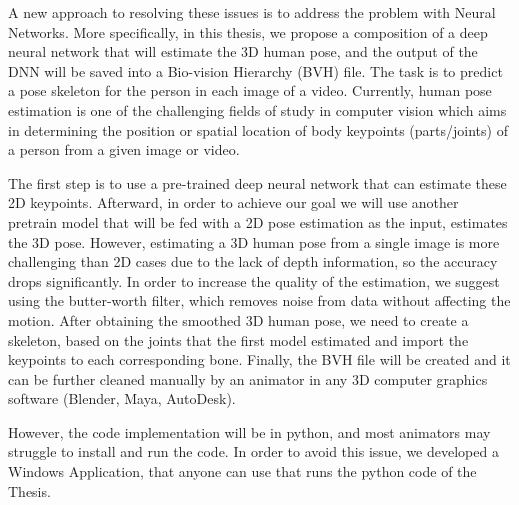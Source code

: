 A new approach to resolving these issues is to address the problem with Neural Networks. More specifically, in this thesis, we propose a composition of a deep neural network \cite{Exploiting temporal information for 3D pose estimation} that will estimate the 3D human pose, and the output of the DNN will be saved into a Bio-vision Hierarchy (BVH) file. The task is to predict a pose skeleton for the person in each image of a video. Currently, human pose estimation is one of the challenging fields of study in computer vision which aims in determining the position or spatial location of body keypoints (parts/joints) of a person from a given image or video. 

The first step is to use a pre-trained deep neural network that can estimate these 2D keypoints. Afterward, \cite{3D Human Pose Estimation from Deep Multi-View 2D Pose,3D Human Pose Estimation Using Convolutional Neural Networks with 2D Pose Information} in order to achieve our goal we will use another pretrain model that will be fed with a 2D pose estimation as the input, estimates the 3D pose. However, estimating a 3D human pose from a single image is more challenging than 2D cases due to the lack of depth information, so the accuracy drops significantly. In order to increase the quality of the estimation, we suggest using the butter-worth filter, which removes noise from data without affecting the motion. After obtaining the smoothed 3D human pose, we need to create a skeleton, based on the joints that the first model estimated and import the keypoints to each corresponding bone. Finally, the BVH file will be created and it can be further cleaned manually by an animator in any 3D computer graphics software (Blender, Maya, AutoDesk). 

However, the code implementation will be in python, and most animators may struggle to install and run the code. In order to avoid this issue, we developed a Windows Application, that anyone can use that runs the python code of the Thesis. 